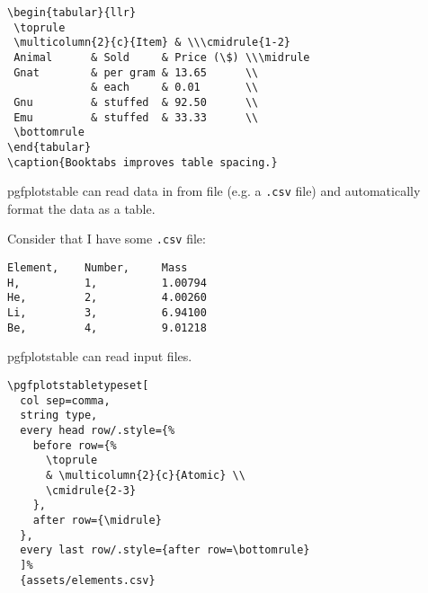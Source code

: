 \begin{frame}[fragile]{}
  \begin{lstlisting}
\begin{tabular}{llr}
 \toprule
 \multicolumn{2}{c}{Item} & \\\cmidrule{1-2}
 Animal      & Sold     & Price (\$) \\\midrule
 Gnat        & per gram & 13.65      \\
             & each     & 0.01       \\
 Gnu         & stuffed  & 92.50      \\
 Emu         & stuffed  & 33.33      \\
 \bottomrule
\end{tabular}
\caption{Booktabs improves table spacing.}
  \end{lstlisting}
\end{frame}

\begin{frame}[fragile]{}
  pgfplotstable can read data in from file (e.g. a \texttt{.csv} file) and
  automatically format the data as a table.

  Consider that I have some \texttt{.csv} file:
  \begin{lstlisting}
Element,    Number,     Mass
H,          1,          1.00794
He,         2,          4.00260
Li,         3,          6.94100
Be,         4,          9.01218
  \end{lstlisting}
\end{frame}

\begin{frame}{}
  \begin{table}
    \caption{pgfplotstable can read input files.}
  \end{table}
\end{frame}

\begin{frame}[fragile]{}
  \begin{lstlisting}
\pgfplotstabletypeset[
  col sep=comma,
  string type,
  every head row/.style={%
    before row={%
      \toprule
      & \multicolumn{2}{c}{Atomic} \\
      \cmidrule{2-3}
    },
    after row={\midrule}
  },
  every last row/.style={after row=\bottomrule}
  ]%
  {assets/elements.csv}
  \end{lstlisting}
\end{frame}


